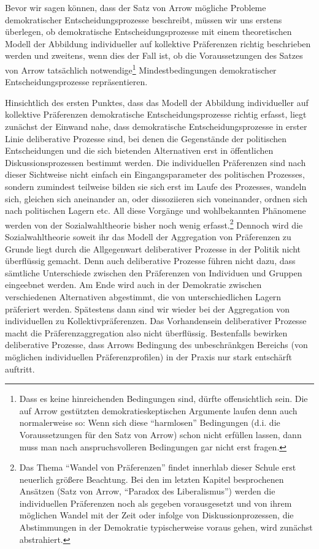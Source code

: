 Bevor wir sagen können, dass der Satz von Arrow mögliche Probleme
demokratischer Entscheidungsprozesse beschreibt, müssen wir uns erstens
überlegen, ob demokratische Entscheidungsprozesse mit einem theoretischen
Modell der Abbildung individueller auf kollektive Präferenzen richtig
beschrieben werden und zweitens, wenn dies der Fall ist, ob die Voraussetzungen
des Satzes von Arrow tatsächlich notwendige\footnote{Dass es keine
hinreichenden Bedingungen sind, dürfte offensichtlich sein. Die auf Arrow
gestützten demokratieskeptischen Argumente laufen denn auch normalerweise so:
Wenn sich diese "`harmlosen"' Bedingungen (d.i. die Voraussetzungen für den Satz
von Arrow) schon nicht erfüllen lassen, dann muss man nach anspruchsvolleren
Bedingungen gar nicht erst fragen.} Mindestbedingungen demokratischer
Entscheidungsprozesse repräsentieren. 

Hinsichtlich des ersten Punktes, dass das Modell der Abbildung individueller auf
kollektive Präferenzen demokratische Entscheidungsprozesse richtig erfasst, liegt
zunächst der Einwand nahe, dass demokratische Entscheidungsprozesse in erster
Linie deliberative Prozesse sind, bei denen die Gegenstände der politischen
Entscheidungen und die sich bietenden Alternativen erst in öffentlichen
Diskussionsprozessen bestimmt werden. Die individuellen Präferenzen sind nach
dieser Sichtweise nicht einfach ein Eingangsparameter des politischen Prozesses,
sondern zumindest teilweise bilden sie sich erst im Laufe des Prozesses, wandeln
sich, gleichen sich aneinander an, oder dissoziieren sich voneinander, ordnen
sich nach politischen Lagern etc. All diese Vorgänge und wohlbekannten Phänomene
werden von der Sozialwahltheorie bisher noch wenig erfasst.\footnote{Das Thema
"`Wandel von Präferenzen"' findet innerhlab dieser Schule erst neuerlich größere
Beachtung. Bei den im letzten Kapitel besprochenen Ansätzen (Satz von Arrow,
"`Paradox des Liberalismus"') werden die individuellen Präferenzen noch als
gegeben vorausgesetzt und von ihrem möglichen Wandel mit der Zeit oder infolge
von Diskussionprozessen, die Abstimmungen in der Demokratie typischerweise voraus
gehen, wird zunächst abstrahiert.} Dennoch wird die Sozialwahltheorie soweit ihr
das Modell der Aggregation von Präferenzen zu Grunde liegt durch die Allgegenwart
deliberativer Prozesse in der Politik nicht überflüssig gemacht. Denn auch
deliberative Prozesse führen nicht dazu, dass sämtliche Unterschiede zwischen den
Präferenzen von Individuen und Gruppen eingeebnet werden. Am Ende wird auch in
der Demokratie zwischen verschiedenen Alternativen abgestimmt, die von
unterschiedlichen Lagern präferiert werden. Spätestens dann sind wir wieder bei
der Aggregation von individuellen zu Kollektivpräferenzen. Das Vorhandensein
deliberativer Prozesse macht die Präferenzaggregation also nicht überflüssig.
Bestenfalls bewirken deliberative Prozesse, dass Arrows Bedingung des
unbeschränkgen Bereichs (von möglichen individuellen Präferenzprofilen) in der
Praxis nur stark entschärft auftritt. 

